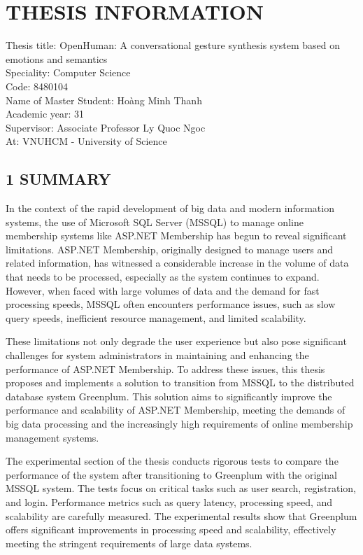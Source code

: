 
\pagebreak
{}
{}
\section*{\centering \MakeUppercase{THESIS INFORMATION}}

Thesis title: OpenHuman: A conversational gesture synthesis system based on emotions and semantics \\
Speciality: Computer Science \\
Code: 8480104\\
Name of Master Student: Hoàng Minh Thanh \\
Academic year: 31\\
Supervisor: Associate Professor Ly Quoc Ngoc\\
At: VNUHCM - University of Science



\subsection*{1 SUMMARY}
In the context of the rapid development of big data and modern information systems, the use of Microsoft SQL Server (MSSQL) to manage online membership systems like ASP.NET Membership has begun to reveal significant limitations. ASP.NET Membership, originally designed to manage users and related information, has witnessed a considerable increase in the volume of data that needs to be processed, especially as the system continues to expand. However, when faced with large volumes of data and the demand for fast processing speeds, MSSQL often encounters performance issues, such as slow query speeds, inefficient resource management, and limited scalability.

These limitations not only degrade the user experience but also pose significant challenges for system administrators in maintaining and enhancing the performance of ASP.NET Membership. To address these issues, this thesis proposes and implements a solution to transition from MSSQL to the distributed database system Greenplum. This solution aims to significantly improve the performance and scalability of ASP.NET Membership, meeting the demands of big data processing and the increasingly high requirements of online membership management systems.

The experimental section of the thesis conducts rigorous tests to compare the performance of the system after transitioning to Greenplum with the original MSSQL system. The tests focus on critical tasks such as user search, registration, and login. Performance metrics such as query latency, processing speed, and scalability are carefully measured. The experimental results show that Greenplum offers significant improvements in processing speed and scalability, effectively meeting the stringent requirements of large data systems.

